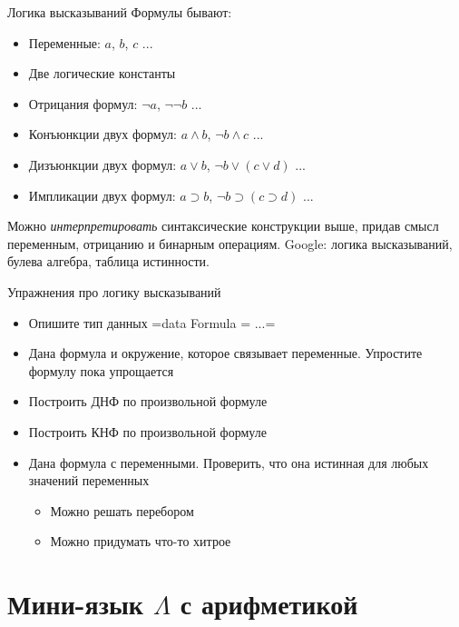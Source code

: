 \documentclass[
  xcolor={svgnames},
  hyperref={colorlinks,citecolor=DeepPink4,linkcolor=DarkRed,urlcolor=DarkBlue}]{beamer}
\begin{document}
\begin{frame}[fragile]{Логика высказываний}
Формулы бывают:
\begin{itemize}
 \item Переменные: $a$, $b$, $c$ ...
 \item Две логические константы
 \item Отрицания формул:  $\neg a$, $\neg\neg b$ ...
 \item Конъюнкции двух формул: $a \wedge b$, $\neg b \wedge c$ ...
 \item Дизъюнкции двух формул: $a \vee b$, $\neg b \vee (c \vee d)$ ...
 \item Импликации двух формул: $a \supset b$, $\neg b \supset (c \supset d)$ ...
\end{itemize}
\pause
Можно \textit{интерпретировать} синтаксические конструкции выше, придав смысл переменным, отрицанию и бинарным операциям. Google: логика высказываний, булева алгебра, таблица истинности.
\end{frame}

\begin{frame}[fragile]{Упражнения про логику высказываний}
\begin{itemize}
 \item Опишите тип данных \hsinline=data Formula = ...=
 \item Дана формула и окружение, которое связывает переменные. Упростите формулу пока упрощается
 \item Построить ДНФ по произвольной формуле
 \item Построить КНФ по произвольной формуле
 \item Дана формула с переменными. Проверить, что она истинная для любых значений переменных
  \begin{itemize}
   \item Можно решать перебором
   \item Можно придумать что-то хитрое
  \end{itemize}
\end{itemize}
\end{frame}

\section{Мини-язык $\Lambda$ с арифметикой}
\end{document}
